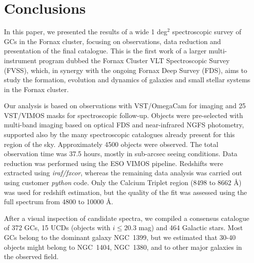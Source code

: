 \documentclass[usenatbib]{mnras}
\begin{document}
\section{Conclusions}
\label{sec:conclusions}
In this paper, we presented the results of a wide 1 deg$^2$ spectroscopic survey of 
GCs in the Fornax cluster, focusing on observations, data 
reduction and presentation of the final catalogue. This is the first work of a 
larger multi-instrument program dubbed the Fornax Cluster VLT Spectroscopic 
Survey (FVSS), which, in synergy with the ongoing Fornax Deep Survey (FDS), 
aims to study the formation, evolution and dynamics of galaxies and small 
stellar systems in the Fornax cluster.

Our analysis is based on observations with VST/OmegaCam for imaging and 25 
VST/VIMOS masks for spectroscopic follow-up. Objects were pre-selected 
with multi-band imaging based on optical FDS and near-infrared NGFS photometry, 
supported also by the many spectroscopic catalogues already 
present for this region of the sky.  Approximately 4500 objects were observed. 
The total observation time was 37.5 hours, mostly in sub-arcsec seeing 
conditions. Data reduction was performed using the ESO VIMOS pipeline. 
Redshifts were extracted using {\it iraf/fxcor}, whereas the remaining data analysis 
was carried out using customer {\it python} code. Only the Calcium Triplet region
(8498 to 8662 \AA) was used for redshift estimation, but the quality of the fit 
was assessed using the full spectrum from 4800 to 10000 \AA.

After a visual inspection of candidate spectra, we compiled a consensus 
catalogue of 372 GCs, 15 UCDs (objects with $i \le 20.3$ mag) and 464 Galactic 
stars. Most GCs belong to the dominant galaxy NGC~1399, but we estimated that 
30-40 objects might belong to NGC~1404, NGC~1380, and to other major galaxies 
in the observed field.
\end{document}
